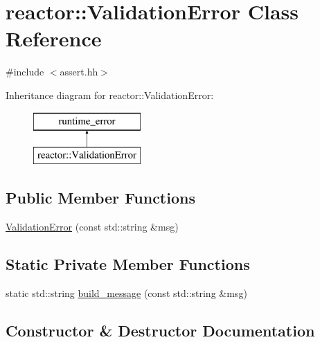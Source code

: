 \hypertarget{classreactor_1_1ValidationError}{}\section{reactor\+:\+:Validation\+Error Class Reference}
\label{classreactor_1_1ValidationError}


{\ttfamily \#include $<$assert.\+hh$>$}

Inheritance diagram for reactor\+:\+:Validation\+Error\+:\begin{figure}[H]
\begin{center}
\leavevmode
\includegraphics[height=2.000000cm]{classreactor_1_1ValidationError}
\end{center}
\end{figure}
\subsection*{Public Member Functions}
\begin{DoxyCompactItemize}
\item 
\hyperlink{classreactor_1_1ValidationError_a6693659e3b5f0846757304ac38a17deb}{Validation\+Error} (const std\+::string \&msg)
\end{DoxyCompactItemize}
\subsection*{Static Private Member Functions}
\begin{DoxyCompactItemize}
\item 
static std\+::string \hyperlink{classreactor_1_1ValidationError_a5651bea57b5c6ba5e7571172baec633c}{build\+\_\+message} (const std\+::string \&msg)
\end{DoxyCompactItemize}


\subsection{Constructor \& Destructor Documentation}
\mbox{\label{classreactor_1_1ValidationError_a6693659e3b5f0846757304ac38a17deb}} 
